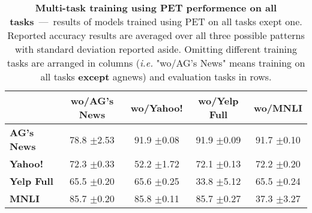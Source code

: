 \begin{table}[h]
	\fontsize{7}{10}
	\selectfont
	\begin{tabular*}{\columnwidth}{l@{\extracolsep{\fill}}cccc}
		\toprule
		& \textbf{wo/AG's News} & \textbf{wo/Yahoo!} & \textbf{wo/Yelp Full} & \textbf{wo/MNLI} \\
		\hline
		\textbf{AG's News}    & 78.8 \tiny$\pm$2.53        & 91.9 \tiny$\pm$0.08        & 91.9   \tiny$\pm$0.09          & 91.7 \tiny$\pm$0.10       \\
		\textbf{Yahoo!}     & 72.3 \tiny$\pm$0.33        & 52.2 \tiny$\pm$1.72        & 72.1   \tiny$\pm$0.13          & 72.2 \tiny$\pm$0.20       \\
		\textbf{Yelp Full} & 65.5 \tiny$\pm$0.20        & 65.6 \tiny$\pm$0.25        & 33.8   \tiny$\pm$5.12          & 65.5 \tiny$\pm$0.24       \\
		\textbf{MNLI}      & 85.7 \tiny$\pm$0.20        & 85.8 \tiny$\pm$0.11        & 85.7   \tiny$\pm$0.27          & 37.3 \tiny$\pm$3.27       \\
		\bottomrule
	\end{tabular*}
	\caption{\textbf{Multi-task training using PET performence on all tasks}~---~results of models trained using PET on all tasks exept one. Reported accuracy results are averaged over all three possible patterns with standard deviation reported aside. Omitting different training tasks are arranged in columns (\textit{i.e.} "wo/AG's News" means training on all tasks \textbf{except} agnews) and evaluation tasks in rows.}\label{tab:multi-use-logits-summary}
\end{table}
